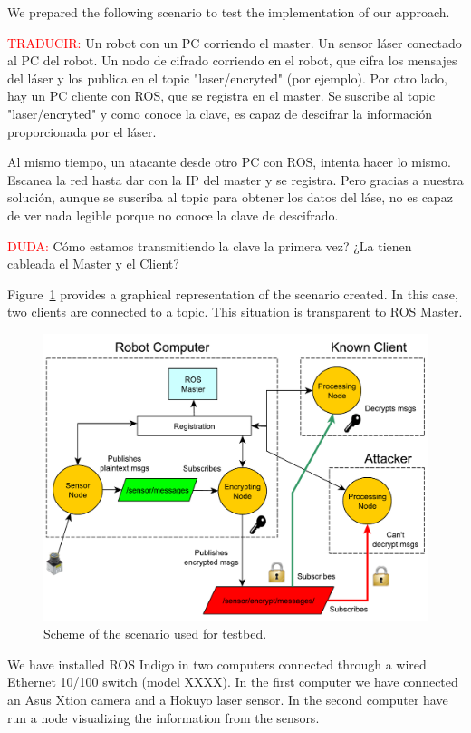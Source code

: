\documentclass[journal,twoside]{JoPhA}
\begin{document}
 
We prepared the following scenario to test the implementation of our approach.

\textcolor{red}{TRADUCIR:} Un robot con un PC corriendo el master. Un sensor láser conectado al PC del robot. Un nodo de cifrado corriendo en el robot, que cifra los mensajes del láser y los publica en el topic "laser/encryted" (por ejemplo).
Por otro lado, hay un PC cliente con ROS, que se registra en el master. Se suscribe al topic "laser/encryted" y como conoce la clave, es capaz de descifrar la información proporcionada por el láser.

Al mismo tiempo, un atacante desde otro PC con ROS, intenta hacer lo mismo. Escanea la red hasta dar con la IP del master y se registra. Pero gracias a nuestra solución, aunque se suscriba al topic para obtener los datos del láse, no es capaz de ver nada legible porque no conoce la clave de descifrado.

\textcolor{red}{DUDA:} C\'omo estamos transmitiendo la clave la primera vez? ¿La tienen cableada el Master y el Client?

Figure~\ref{fig:TestBed} provides a graphical representation of the scenario created. In this case, two clients are connected to a topic. This situation is transparent to ROS Master.


\begin{figure}[ht]
    \centering
    \includegraphics[width=.5\textwidth]{TestBed_complete.pdf}
    \caption{Scheme of the scenario used for testbed.}
  \label{fig:TestBed}
\end{figure}


We have installed ROS Indigo in two computers connected through a wired Ethernet 10/100 switch (model XXXX). In the first computer we have connected an Asus Xtion camera and a Hokuyo laser sensor. In the second computer have run a node visualizing the information from the sensors. %
\end{document}
